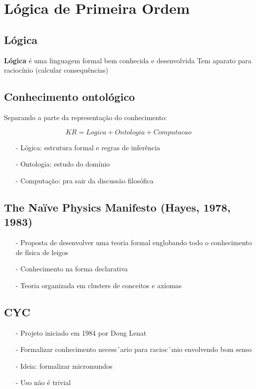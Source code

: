 \documentclass{article}
\begin{document}
\section{Lógica de Primeira Ordem}

\subsection{Lógica}

\textbf{Lógica} é uma linguagem formal bem conhecida e desenvolvida
Tem aparato para raciocínio (calcular consequências)

\subsection{Conhecimento ontológico}

Separando a parte da representação do conhecimento:

$$KR = Logica + Ontologia + Computacao$$

\begin{itemize}
    \item [-] Lógica: estrutura formal e regras de inferência
    \item [-] Ontologia: estudo do domínio
    \item [-] Computação: pra sair da discussão filosófica
\end{itemize}

\subsection{The Naïve Physics Manifesto (Hayes, 1978, 1983)}

\begin{itemize}
    \item [-] Proposta de desenvolver uma teoria formal englobando todo o
    conhecimento de física de leigos
    \item [-] Conhecimento na forma declarativa
    \item [-] Teoria organizada em clusters de conceitos e axiomas
\end{itemize}

\subsection{CYC}

\begin{itemize}
    \item [-] Projeto iniciado em 1984 por Doug Lenat
    \item [-] Formalizar conhecimento necess´ario para racioc´ınio
    envolvendo bom senso
    \item [-] Ideia: formalizar micromundos
    \item [-] Uso não é trivial
\end{itemize}
\end{document}
